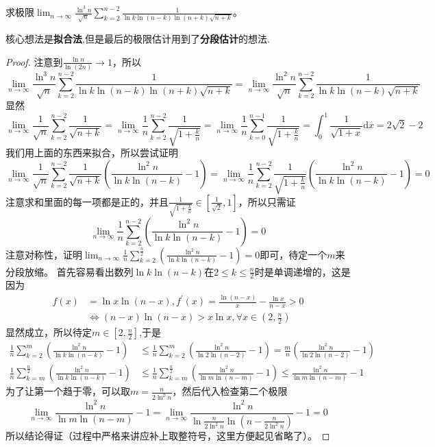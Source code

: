 \documentclass[../../main.tex]{subfiles}
\begin{document}
\begin{example}
求极限\(\lim_{n\rightarrow\infty}\frac{\ln^3n}{\sqrt{n}}\sum_{k = 2}^{n - 2}\frac{1}{\ln k\ln(n - k)\ln(n + k)\sqrt{n + k}}\)。
\end{example}
\begin{note}
核心想法是\textbf{拟合法},但是最后的极限估计用到了\textbf{分段估计}的想法.
\end{note}
\begin{proof}
注意到\(\frac{\ln n}{\ln(2n)}\to1\)，所以
\[
\lim_{n\rightarrow\infty}\frac{\ln^3n}{\sqrt{n}}\sum_{k = 2}^{n - 2}\frac{1}{\ln k\ln(n - k)\ln(n + k)\sqrt{n + k}}=\lim_{n\rightarrow\infty}\frac{\ln^2n}{\sqrt{n}}\sum_{k = 2}^{n - 2}\frac{1}{\ln k\ln(n - k)\sqrt{n + k}}
\]
显然
\[
\lim_{n\rightarrow\infty}\frac{1}{\sqrt{n}}\sum_{k = 2}^{n - 2}\frac{1}{\sqrt{n + k}}=\lim_{n\rightarrow\infty}\frac{1}{n}\sum_{k = 2}^{n - 2}\frac{1}{\sqrt{1+\frac{k}{n}}}=\lim_{n\rightarrow\infty}\frac{1}{n}\sum_{k = 0}^{n - 1}\frac{1}{\sqrt{1+\frac{k}{n}}}=\int_{0}^{1}\frac{1}{\sqrt{1 + x}}\mathrm{d}x=2\sqrt{2}-2
\]
我们用上面的东西来拟合，所以尝试证明
\[
\lim_{n\rightarrow\infty}\frac{1}{\sqrt{n}}\sum_{k = 2}^{n - 2}\frac{1}{\sqrt{n + k}}\left(\frac{\ln^2n}{\ln k\ln(n - k)}-1\right)=\lim_{n\rightarrow\infty}\frac{1}{n}\sum_{k = 2}^{n - 2}\frac{1}{\sqrt{1+\frac{k}{n}}}\left(\frac{\ln^2n}{\ln k\ln(n - k)}-1\right)=0
\]
注意求和里面的每一项都是正的，并且\(\frac{1}{\sqrt{1+\frac{k}{n}}}\in\left[\frac{1}{\sqrt{2}},1\right]\)，所以只需证
\[
\lim_{n\rightarrow\infty}\frac{1}{n}\sum_{k = 2}^{n - 2}\left(\frac{\ln^2n}{\ln k\ln(n - k)}-1\right)=0
\]
注意对称性，证明\(\lim_{n\rightarrow\infty}\frac{1}{n}\sum_{k = 2}^{\frac{n}{2}}\left(\frac{\ln^2n}{\ln k\ln(n - k)}-1\right)=0\)即可，待定一个\(m\)来分段放缩。
首先容易看出数列\(\ln k\ln(n - k)\)在\(2\leq k\leq\frac{n}{2}\)时是单调递增的，这是因为
\begin{align*}
f(x)&=\ln x\ln(n - x),f^\prime(x)=\frac{\ln(n - x)}{x}-\frac{\ln x}{n - x}>0\\
&\Leftrightarrow(n - x)\ln(n - x)>x\ln x,\forall x\in\left(2,\frac{n}{2}\right)
\end{align*}
显然成立，所以待定$m\in[2,\frac{n}{2}]$,于是
\begin{align*}
\frac{1}{n}\sum_{k = 2}^{m}\left(\frac{\ln^2n}{\ln k\ln(n - k)}-1\right)&\leq\frac{1}{n}\sum_{k = 2}^{m}\left(\frac{\ln^2n}{\ln 2\ln(n - 2)}-1\right)=\frac{m}{n}\left(\frac{\ln^2n}{\ln 2\ln(n - 2)}-1\right)\\
\frac{1}{n}\sum_{k = m}^{\frac{n}{2}}\left(\frac{\ln^2n}{\ln k\ln(n - k)}-1\right)&\leq\frac{1}{n}\sum_{k = m}^{\frac{n}{2}}\left(\frac{\ln^2n}{\ln m\ln(n - m)}-1\right)\leq\frac{\ln^2n}{\ln m\ln(n - m)}-1
\end{align*}
为了让第一个趋于零，可以取\(m = \frac{n}{2\ln^2n}\)，然后代入检查第二个极限
\[
\lim_{n\rightarrow\infty}\frac{\ln^2n}{\ln m\ln(n - m)}-1=\lim_{n\rightarrow\infty}\frac{\ln^2n}{\ln\frac{n}{2\ln^2n}\ln\left(n-\frac{n}{2\ln^2n}\right)}-1 = 0
\]
所以结论得证（过程中严格来讲应补上取整符号，这里方便起见省略了）。
\end{proof}
\end{document}
